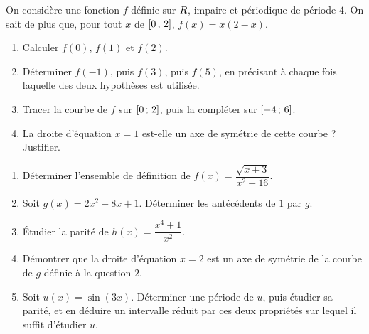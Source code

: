 \begin{jecherche}\label{t11s-c01-problem}
On considère une fonction $f$ définie sur $R$, impaire et périodique de
période $4$. On sait de plus que, pour tout $x$ de $\left[0\,;\,2\right]$,
$f(x) = x(2-x)$.

\begin{enumerate}[label=\textbf{\arabic*.}, leftmargin=1.6em, itemsep=0.2em]
  \item Calculer $f(0)$, $f(1)$ et $f(2)$.
  \item Déterminer $f(-1)$, puis $f(3)$, puis $f(5)$, en précisant à chaque
        fois laquelle des deux hypothèses est utilisée.
  \item Tracer la courbe de $f$ sur $\left[0\,;\,2\right]$, puis la compléter
        sur $\left[-4\,;\,6\right]$.
  \item La droite d'équation $x = 1$ est-elle un axe de symétrie de cette
        courbe ? Justifier.
\end{enumerate}
\end{jecherche}

\begin{jemeteste}\label{t11s-c01-test}
\begin{enumerate}[label=\textbf{\arabic*.}, leftmargin=1.6em, itemsep=0.25em]
  \item Déterminer l'ensemble de définition de
        $f(x) = \dfrac{\sqrt{x+3}}{x^{2}-16}$.
  \item Soit $g(x) = 2x^{2} - 8x + 1$. Déterminer les antécédents de $1$ par
        $g$.
  \item Étudier la parité de $h(x) = \dfrac{x^{4}+1}{x^{2}}$.
  \item Démontrer que la droite d'équation $x = 2$ est un axe de symétrie de
        la courbe de $g$ définie à la question $2$.
  \item Soit $u(x) = \sin(3x)$. Déterminer une période de $u$, puis étudier
        sa parité, et en déduire un intervalle réduit par ces deux propriétés sur lequel il
        suffit d'étudier $u$.
\end{enumerate}
\end{jemeteste}

